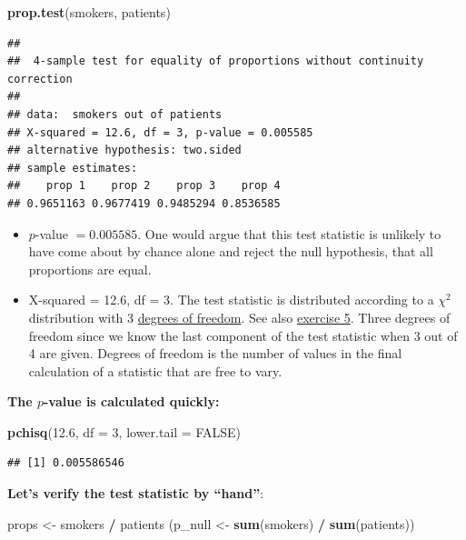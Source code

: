 \documentclass[
]{book}
\newenvironment{Shaded}{\begin{snugshade}}{\end{snugshade}}
\newcommand{\AttributeTok}[1]{\textcolor[rgb]{0.13,0.29,0.53}{#1}}
\newcommand{\ConstantTok}[1]{\textcolor[rgb]{0.56,0.35,0.01}{#1}}
\newcommand{\DecValTok}[1]{\textcolor[rgb]{0.00,0.00,0.81}{#1}}
\newcommand{\FloatTok}[1]{\textcolor[rgb]{0.00,0.00,0.81}{#1}}
\newcommand{\FunctionTok}[1]{\textcolor[rgb]{0.13,0.29,0.53}{\textbf{#1}}}
\newcommand{\NormalTok}[1]{#1}
\newcommand{\OtherTok}[1]{\textcolor[rgb]{0.56,0.35,0.01}{#1}}
\newcommand{\SpecialCharTok}[1]{\textcolor[rgb]{0.81,0.36,0.00}{\textbf{#1}}}
\begin{document}
\begin{Shaded}
\begin{Highlighting}[]
\FunctionTok{prop.test}\NormalTok{(smokers, patients)}
\end{Highlighting}
\end{Shaded}

\begin{verbatim}
## 
##  4-sample test for equality of proportions without continuity correction
## 
## data:  smokers out of patients
## X-squared = 12.6, df = 3, p-value = 0.005585
## alternative hypothesis: two.sided
## sample estimates:
##    prop 1    prop 2    prop 3    prop 4 
## 0.9651163 0.9677419 0.9485294 0.8536585
\end{verbatim}

\begin{itemize}
\item
  \(p\)-value \(= 0.005585\). One would argue that this test statistic is unlikely to have come about by chance
  alone and reject the null hypothesis, that all proportions are equal.
\item
  X-squared = 12.6, df = 3. The test statistic is distributed according to a \(\chi^2\) distribution
  with 3 \href{https://en.wikipedia.org/wiki/Degrees_of_freedom_(statistics)}{degrees of freedom}.
  See also \hyperref[exercise5_nhst]{exercise 5}. Three degrees of freedom since we know the last component of the
  test statistic when 3 out of 4 are given.
  Degrees of freedom is the number of values in the final calculation of a statistic that are free to vary.
\end{itemize}

\textbf{The \(p\)-value is calculated quickly:}

\begin{Shaded}
\begin{Highlighting}[]
\FunctionTok{pchisq}\NormalTok{(}\FloatTok{12.6}\NormalTok{, }\AttributeTok{df =} \DecValTok{3}\NormalTok{, }\AttributeTok{lower.tail =} \ConstantTok{FALSE}\NormalTok{)}
\end{Highlighting}
\end{Shaded}

\begin{verbatim}
## [1] 0.005586546
\end{verbatim}

\textbf{Let's verify the test statistic by ``hand''}:

\begin{Shaded}
\begin{Highlighting}[]
\NormalTok{props }\OtherTok{\textless{}{-}}\NormalTok{ smokers }\SpecialCharTok{/}\NormalTok{ patients}
\NormalTok{(p\_null }\OtherTok{\textless{}{-}} \FunctionTok{sum}\NormalTok{(smokers) }\SpecialCharTok{/} \FunctionTok{sum}\NormalTok{(patients))}
\end{Highlighting}
\end{Shaded}
\end{document}
